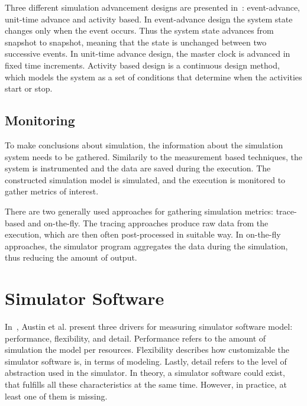 Three different simulation advancement designs are presented in~\cite{peros:2009:simulation}: event-advance, unit-time advance and activity based. In event-advance design the system state changes only when the event occurs. Thus the system state advances from snapshot to snapshot, meaning that the state is unchanged between two successive events. In unit-time advance design, the master clock is advanced in fixed time increments. Activity based design is a continuous design method, which models the system as a set of conditions that determine when the activities start or stop.~\cite{peros:2009:simulation}

\subsection{Monitoring}
To make conclusions about simulation, the information about the simulation system needs to be gathered. Similarily to the measurement based techniques, the system is instrumented and the data are saved during the execution. The constructed simulation model is simulated, and the execution is monitored to gather metrics of interest.~\cite{jain:1991:AOCSPA, peros:2009:simulation}

There are two generally used approaches for gathering simulation metrics: trace-based and on-the-fly. The tracing approaches produce raw data from the execution, which are then often post-processed in suitable way. In on-the-fly approaches, the simulator program aggregates the data during the simulation, thus reducing the amount of output.~\cite{jain:1991:AOCSPA, peros:2009:simulation}

\section{Simulator Software}

In~\cite{Austin:2002:SimpleScalar}, Austin et al. present three drivers for measuring simulator software model: performance, flexibility, and detail. Performance refers to the amount of simulation the model per resources. Flexibility describes how customizable the simulator software is, in terms of modeling. Lastly, detail refers to the level of abstraction used in the simulator. In theory, a simulator software could exist, that fulfills all these characteristics at the same time. However, in practice, at least one of them is missing.~\cite{Austin:2002:SimpleScalar}

